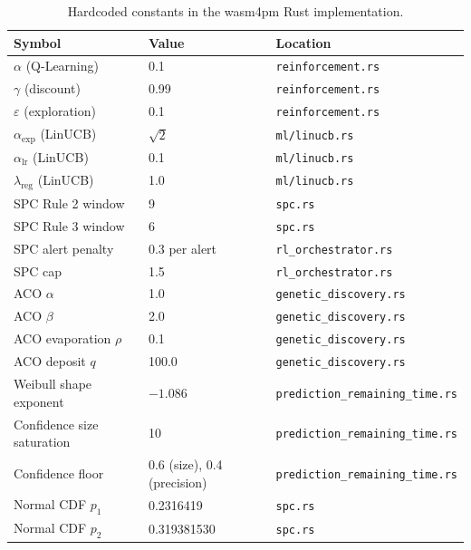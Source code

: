 \documentclass[11pt,a4paper]{article}
\begin{document}
\begin{table}[h!]
\centering
\begin{tabular}{lll}
\toprule
Symbol & Value & Location \\
\midrule
$\alpha$ (Q-Learning) & 0.1 & \texttt{reinforcement.rs} \\
$\gamma$ (discount) & 0.99 & \texttt{reinforcement.rs} \\
$\varepsilon$ (exploration) & 0.1 & \texttt{reinforcement.rs} \\
$\alpha_\text{exp}$ (LinUCB) & $\sqrt{2}$ & \texttt{ml/linucb.rs} \\
$\alpha_\text{lr}$ (LinUCB) & 0.1 & \texttt{ml/linucb.rs} \\
$\lambda_\text{reg}$ (LinUCB) & 1.0 & \texttt{ml/linucb.rs} \\
SPC Rule 2 window & 9 & \texttt{spc.rs} \\
SPC Rule 3 window & 6 & \texttt{spc.rs} \\
SPC alert penalty & 0.3 per alert & \texttt{rl\_orchestrator.rs} \\
SPC cap & 1.5 & \texttt{rl\_orchestrator.rs} \\
ACO $\alpha$ & 1.0 & \texttt{genetic\_discovery.rs} \\
ACO $\beta$ & 2.0 & \texttt{genetic\_discovery.rs} \\
ACO evaporation $\rho$ & 0.1 & \texttt{genetic\_discovery.rs} \\
ACO deposit $q$ & 100.0 & \texttt{genetic\_discovery.rs} \\
Weibull shape exponent & $-1.086$ & \texttt{prediction\_remaining\_time.rs} \\
Confidence size saturation & 10 & \texttt{prediction\_remaining\_time.rs} \\
Confidence floor & 0.6 (size), 0.4 (precision) & \texttt{prediction\_remaining\_time.rs} \\
Normal CDF $p_1$ & 0.2316419 & \texttt{spc.rs} \\
Normal CDF $p_2$ & 0.319381530 & \texttt{spc.rs} \\
\bottomrule
\end{tabular}
\caption{Hardcoded constants in the wasm4pm Rust implementation.}
\end{table}
\end{document}
